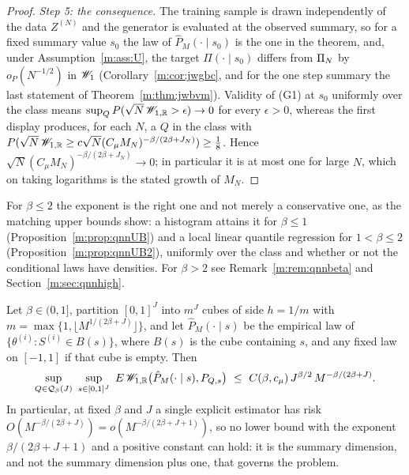 \begin{proof}
\emph{Step 5: the consequence.} The training sample is drawn independently of the data $Z^{(N)}$ and the generator is evaluated at the observed summary, so for a fixed summary value $s_0$ the law of $\hat P_M(\cdot\mid s_0)$ is the one in the theorem, and, under Assumption~\ref{m:ass:U}, the target $\Pi(\cdot\mid s_0)$ differs from $\Pi_N$ by $o_P(N^{-1/2})$ in $\mathscr{W}_1$ (Corollary~\ref{m:cor:jwgbc}, and for the one step summary the last statement of Theorem~\ref{m:thm:jwbvm}). Validity of (G1) at $s_0$ uniformly over the class means $\sup_QP(\sqrt N\,\mathscr{W}_{1,\mathbb{R}}>\epsilon)\to0$ for every $\epsilon>0$, whereas the first display produces, for each $N$, a $Q$ in the class with $P(\sqrt N\,\mathscr{W}_{1,\mathbb{R}}\ge c\sqrt N(C_\mu M_N)^{-\beta/(2\beta+J_N)})\ge\frac18$. Hence $\sqrt N(C_\mu M_N)^{-\beta/(2\beta+J_N)}\to0$; in particular it is at most one for large $N$, which on taking logarithms is the stated growth of $M_N$.
\end{proof}

For $\beta\le2$ the exponent is the right one and not merely a conservative one, as the matching upper bounds show: a histogram attains it for $\beta\le1$ (Proposition~\ref{m:prop:qnnUB}) and a local linear quantile regression for $1<\beta\le2$ (Proposition~\ref{m:prop:qnnUB2}), uniformly over the class and whether or not the conditional laws have densities. For $\beta>2$ see Remark~\ref{m:rem:qnnbeta} and Section~\ref{m:sec:qnnhigh}.

\begin{proposition}\label{m:prop:qnnUB}
Let $\beta\in(0,1]$, partition $[0,1]^J$ into $m^J$ cubes of side $h=1/m$ with $m=\max\{1,\lfloor M^{1/(2\beta+J)}\rfloor\}$, and let $\hat P_M(\cdot\mid s)$ be the empirical law of $\{\theta^{(i)}:S^{(i)}\in B(s)\}$, where $B(s)$ is the cube containing $s$, and any fixed law on $[-1,1]$ if that cube is empty. Then
\[
\sup_{Q\in\mathcal Q_\beta(J)}\ \sup_{s\in[0,1]^J}\ E\,\Wone_{1,\R}\big(\hat P_M(\cdot\mid s),P_{Q,s}\big)\ \le\ C(\beta,c_\mu)\,J^{\beta/2}\,M^{-\beta/(2\beta+J)} .
\]
In particular, at fixed $\beta$ and $J$ a single explicit estimator has risk $O(M^{-\beta/(2\beta+J)})=o(M^{-\beta/(2\beta+J+1)})$, so no lower bound with the exponent $\beta/(2\beta+J+1)$ and a positive constant can hold: it is the summary dimension, and not the summary dimension plus one, that governs the problem.
\end{proposition}

